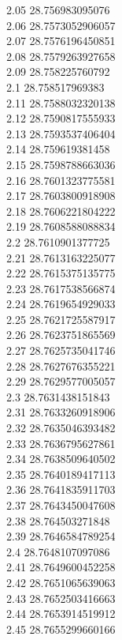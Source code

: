 {2.05	28.756983095076\\
2.06	28.7573052906057\\
2.07	28.7576196450851\\
2.08	28.7579263927658\\
2.09	28.758225760792\\
2.1	28.758517969383\\
2.11	28.7588032320138\\
2.12	28.7590817555933\\
2.13	28.7593537406404\\
2.14	28.759619381458\\
2.15	28.7598788663036\\
2.16	28.7601323775581\\
2.17	28.7603800918908\\
2.18	28.7606221804222\\
2.19	28.7608588088834\\
2.2	28.7610901377725\\
2.21	28.7613163225077\\
2.22	28.7615375135775\\
2.23	28.7617538566874\\
2.24	28.7619654929033\\
2.25	28.7621725587917\\
2.26	28.7623751865569\\
2.27	28.7625735041746\\
2.28	28.7627676355221\\
2.29	28.7629577005057\\
2.3	28.7631438151843\\
2.31	28.7633260918906\\
2.32	28.7635046393482\\
2.33	28.7636795627861\\
2.34	28.7638509640502\\
2.35	28.7640189417113\\
2.36	28.7641835911703\\
2.37	28.7643450047608\\
2.38	28.764503271848\\
2.39	28.7646584789254\\
2.4	28.7648107097086\\
2.41	28.7649600452258\\
2.42	28.7651065639063\\
2.43	28.7652503416663\\
2.44	28.7653914519912\\
2.45	28.7655299660166\\
}
